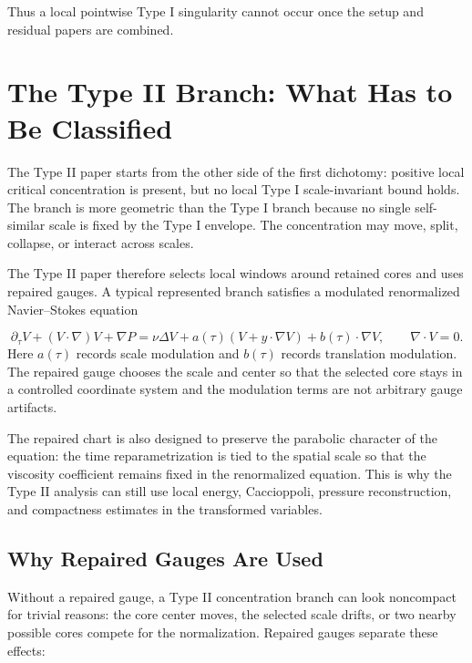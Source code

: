 \documentclass[11pt]{amsart}
\begin{document}
Thus a local pointwise Type I singularity cannot occur once the setup and residual papers are combined.

\section{The Type II Branch: What Has to Be Classified}

The Type II paper starts from the other side of the first dichotomy: positive local critical concentration is present, but no local Type I scale-invariant bound holds.  The branch is more geometric than the Type I branch because no single self-similar scale is fixed by the Type I envelope.  The concentration may move, split, collapse, or interact across scales.

The Type II paper therefore selects local windows around retained cores and uses repaired gauges.  A typical represented branch satisfies a modulated renormalized Navier--Stokes equation

\[
  \partial_\tau V+(V\cdot\nabla)V+\nabla P
  =
  \nu\Delta V+a(\tau)(V+y\cdot\nabla V)+b(\tau)\cdot\nabla V,
  \qquad \nabla\cdot V=0.
\]
Here \(a(\tau)\) records scale modulation and \(b(\tau)\) records translation modulation.  The repaired gauge chooses the scale and center so that the selected core stays in a controlled coordinate system and the modulation terms are not arbitrary gauge artifacts.

The repaired chart is also designed to preserve the parabolic character of the equation: the time reparametrization is tied to the spatial scale so that the viscosity coefficient remains fixed in the renormalized equation.  This is why the Type II analysis can still use local energy, Caccioppoli, pressure reconstruction, and compactness estimates in the transformed variables.

\subsection{Why Repaired Gauges Are Used}

Without a repaired gauge, a Type II concentration branch can look noncompact for trivial reasons: the core center moves, the selected scale drifts, or two nearby possible cores compete for the normalization.  Repaired gauges separate these effects:
\end{document}

